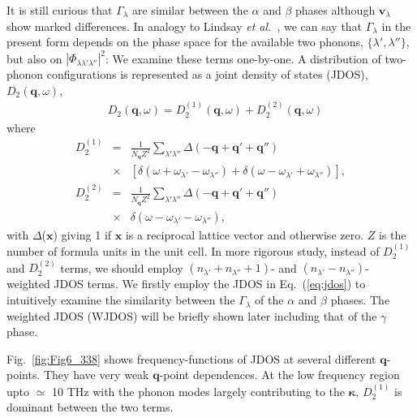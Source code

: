 \documentclass[twocolumn,amsmath,amssymb,a4paper,prb,superscriptaddress,floatfix]{revtex4-1}
\begin{document}
It is still curious that $\Gamma_\lambda$ are similar between the $\alpha$ and
$\beta$ phases although $\mathbf{v}_\lambda$ show marked differences.
%
%
In analogy to Lindsay {\it et al.}~\cite{Lindsay}, we can say that
$\Gamma_\lambda$ in the present form depends on the phase space for the
available two phonons, $\{\lambda', \lambda''\}$, but also on
$|\Phi_{\lambda\lambda'\lambda''}|^2$: We examine these terms one-by-one. A
distribution of two-phonon configurations is represented as a joint density of
states (JDOS),
${D_2(\mathbf{q},\omega)}$,  
\begin{align}
 \label{eq:jdos}
 &D_2(\mathbf{q},\omega) = D_2^{(1)}(\mathbf{q},\omega) +  D_2^{(2)}(\mathbf{q},\omega)
\end{align}
where 
\begin{eqnarray*}
	D_2^{(1)} & = & \frac{1}{N_\mathbf{q}Z^2} \sum_{\lambda'\lambda''}\Delta(-\mathbf{q} + \mathbf{q'} + \mathbf{q''}) \nonumber \\
								   & \times & [\delta(\omega + \omega_{\lambda'} - \omega_{\lambda''}) + \delta(\omega - \omega_{\lambda'} + \omega_{\lambda''})],\\
	D_2^{(2)} & = & \frac{1}{N_\mathbf{q}Z^2} \sum_{\lambda'\lambda''}\Delta(-\mathbf{q} + \mathbf{q'} + \mathbf{q''}) \nonumber \\
								   & \times & \delta(\omega - \omega_{\lambda'} - \omega_{\lambda''}),
\end{eqnarray*}
with $\Delta$($\mathbf{x}$) giving 1 if $\mathbf{x}$ is a reciprocal lattice
vector and otherwise zero. $Z$ is the number of formula units in the unit cell.
In more rigorous study, instead of $D_2^{(1)}$ and $D_2^{(2)}$ terms, we should
employ  $(n_{\lambda'}+n_{\lambda''}+1)$- and $(n_{\lambda'}-n_{\lambda''})$-
weighted JDOS terms.  We firstly employ the JDOS in Eq.~(\ref{eq:jdos}) to
intuitively examine the similarity between the $\Gamma_{\lambda}$ of the
$\alpha$ and $\beta$ phases. The weighted JDOS (WJDOS) will be briefly shown
later including that of the $\gamma$ phase. 

Fig.~\ref{fig:Fig6_338} shows frequency-functions of JDOS at several different
$\mathbf{q}$-points. They have very weak $\mathbf{q}$-point dependences. At the
low frequency region upto $\simeq$ 10 THz with the phonon modes largely
contributing to the $\boldsymbol{\kappa}$, $D_2^{(1)}$ is dominant between the
two terms. 
\end{document}

